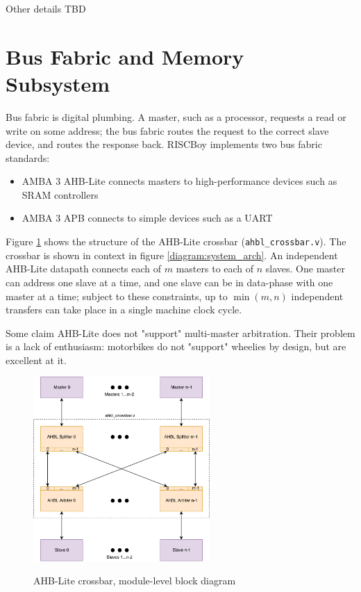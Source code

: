 \documentclass[notitlepage]{article}
\begin{document}
Other details TBD

\section{Bus Fabric and Memory Subsystem}

Bus fabric is digital plumbing. A master, such as a processor, requests a read or write on some address; the bus fabric routes the request to the correct slave device, and routes the response back. RISCBoy implements two bus fabric standards:

\begin{itemize}
\item AMBA 3 AHB-Lite connects masters to high-performance devices such as SRAM controllers
\item AMBA 3 APB connects to simple devices such as a UART
\end{itemize}

Figure \ref{diagram:crossbar_structure} shows the structure of the AHB-Lite crossbar ({\tt ahbl\_crossbar.v}). The crossbar is shown in context in figure \ref{diagram:system_arch}. An independent AHB-Lite datapath connects each of $m$ masters to each of $n$ slaves. One master can address one slave at a time, and one slave can be in data-phase with one master at a time; subject to these constraints, up to $\min(m,n)$ independent transfers can take place in a single machine clock cycle.

Some claim AHB-Lite does not "support" multi-master arbitration. Their problem is a lack of enthusiasm: motorbikes do not "support" wheelies by design, but are excellent at it.

\begin{figure}[!htb]
\centering
\caption{AHB-Lite crossbar, module-level block diagram} \includegraphics[width=0.6\textwidth]{diagrams/crossbar_structure.pdf}
\label{diagram:crossbar_structure}
\end{figure}
\end{document}

